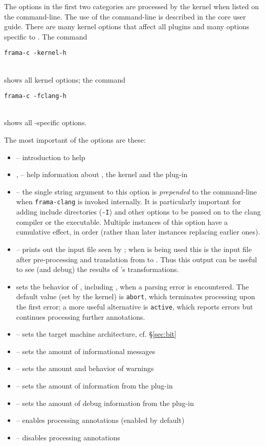 The options in the first two categories are processed by the \fc kernel when listed on the \fc command-line. 
The use of the \fc command-line is described in the core \fc 
user guide.
There are many kernel options that affect all plugins and many options specific to \fclang.
The command \\
\centerline{\lstinline|frama-c -kernel-h|} \\
shows all kernel options; the command\\
\centerline{\lstinline|frama-c -fclang-h|} \\
shows all \fcl-specific options.

The most important of the options are these:
\begin{itemize}
\item {} -- introduction to \framac help
    \item {},  -- help information about \fc, the \fc kernel and the \fcl plug-in
	\item {} -- the single string argument to this option is \textit{prepended} to the command-line when 
	\lstinline|frama-clang| is invoked internally. It is particularly 
	important for adding include directories (\lstinline|-I|) and
	other options to be passed on to the clang compiler or the \irg executable. 
	Multiple instances of this option have a cumulative effect, in order (rather
	than later instances replacing earlier ones).
    \item {} -- prints out the input file seen by \fc; when \fcl is being used this is the input file after pre-processing and translation from \cpp to \C. Thus this output can be useful to see (and debug) the results of \fcl's transformations.
    \item {} sets the behavior of \framac, including \fclang, when a parsing error is encountered. The default value (set by the kernel) is \texttt{abort}, which terminates processing upon the first error; a more useful alternative is \texttt{active}, which reports errors but continues processing further annotations.
	\item {} -- sets the target machine architecture, cf. \S\ref{sec:bit}
	\item {} -- sets the amount of informational messages
	\item {} -- sets the amount and behavior of warnings
	\item {} -- sets the amount of information from the \fclang plug-in
	\item {} -- sets the amount of debug information from the \fclang plug-in
	\item {} -- enables processing \NAME annotations (enabled by default)
	\item {} -- disables processing \NAME annotations
\end{itemize}


